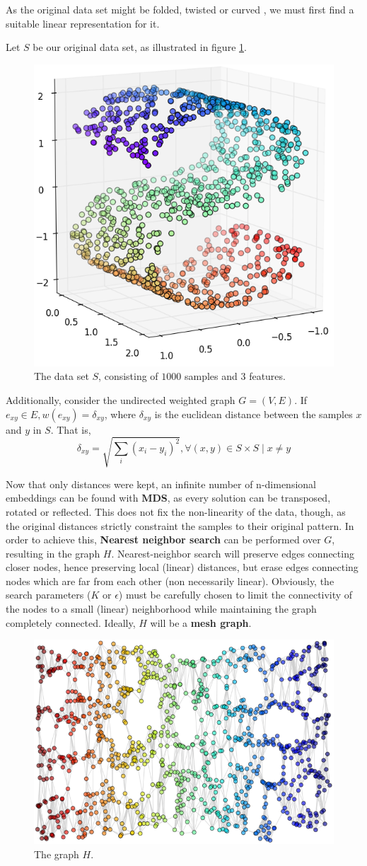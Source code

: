 \documentclass[12pt]{article}
\begin{document}
As the original data set might be folded, twisted or curved \cite{ten2000}, we must first find a suitable linear representation for it.

Let $S$ be our original data set, as illustrated in figure \ref{fig:mani_s}.

\begin{figure}[H]
	\centering
	\captionsetup{justification=centering}
	\includegraphics[width=.5\linewidth]{mani_s}
	\caption{The data set $S$, consisting of $1000$ samples and $3$ features.}
	\label{fig:mani_s}
\end{figure}

Additionally, consider the undirected weighted graph $G=(V, E)$. If $e_{xy} \in E, w(e_{xy}) = \delta_{xy}$, where $\delta_{xy}$ is the euclidean distance between the samples $x$ and $y$ in $S$. That is,
$$\delta_{xy} = \sqrt{\sum_{i} (x_i - y_i)^2}, \forall (x, y) \in S\times S \mid x\ne y$$

Now that only distances were kept, an infinite number of n-dimensional embeddings can be found with \textbf{MDS}, as every solution can be transposed, rotated or reflected. This does not fix the non-linearity of the data, though, as the original distances strictly constraint the samples to their original pattern. In order to achieve this, \textbf{Nearest neighbor search} can be performed over $G$, resulting in the graph $H$. Nearest-neighbor search will preserve edges connecting closer nodes, hence preserving local (linear) distances, but erase edges connecting nodes which are far from each other (non necessarily linear). Obviously, the search parameters ($K$ or $\epsilon$) must be carefully chosen to limit the connectivity of the nodes to a small (linear) neighborhood while maintaining the graph completely connected. Ideally, $H$ will be a \textbf{mesh graph}.

\begin{figure}[H]
	\centering
	\captionsetup{justification=centering}
	\includegraphics[width=.5\linewidth]{mani_s_3}
	\caption{The graph $H$.}
	\label{fig:mani_s_graph_h}
\end{figure}
\end{document}

